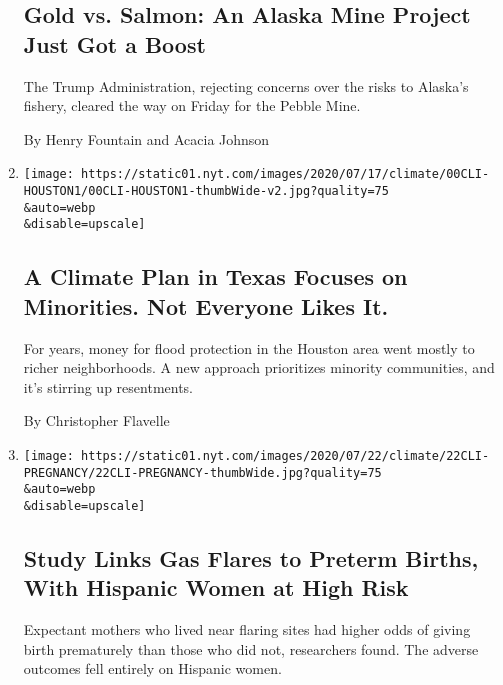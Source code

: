 \begin{enumerate}
  \hypertarget{gold-vs-salmon-an-alaska-mine-project-just-got-a-boost}{%
  \subsection{Gold vs. Salmon: An Alaska Mine Project Just Got a
  Boost}\label{gold-vs-salmon-an-alaska-mine-project-just-got-a-boost}}

  The Trump Administration, rejecting concerns over the risks to
  Alaska's fishery, cleared the way on Friday for the Pebble Mine.

  By Henry Fountain and Acacia Johnson
\item
  \href{/2020/07/24/climate/houston-flooding-race.html}{}

  \texttt{[image: https://static01.nyt.com/images/2020/07/17/climate/00CLI-HOUSTON1/00CLI-HOUSTON1-thumbWide-v2.jpg?quality=75\\\&auto=webp\\\&disable=upscale]}

  \hypertarget{a-climate-plan-in-texas-focuses-on-minorities-not-everyone-likes-it}{%
  \subsection{A Climate Plan in Texas Focuses on Minorities. Not
  Everyone Likes
  It.}\label{a-climate-plan-in-texas-focuses-on-minorities-not-everyone-likes-it}}

  For years, money for flood protection in the Houston area went mostly
  to richer neighborhoods. A new approach prioritizes minority
  communities, and it's stirring up resentments.

  By Christopher Flavelle
\item
  \href{/2020/07/22/climate/gas-flares-premature-babies.html}{}

  \texttt{[image: https://static01.nyt.com/images/2020/07/22/climate/22CLI-PREGNANCY/22CLI-PREGNANCY-thumbWide.jpg?quality=75\\\&auto=webp\\\&disable=upscale]}

  \hypertarget{study-links-gas-flares-to-preterm-births-with-hispanic-women-at-high-risk}{%
  \subsection{Study Links Gas Flares to Preterm Births, With Hispanic
  Women at High
  Risk}\label{study-links-gas-flares-to-preterm-births-with-hispanic-women-at-high-risk}}

  Expectant mothers who lived near flaring sites had higher odds of
  giving birth prematurely than those who did not, researchers found.
  The adverse outcomes fell entirely on Hispanic women.


\end{enumerate}
